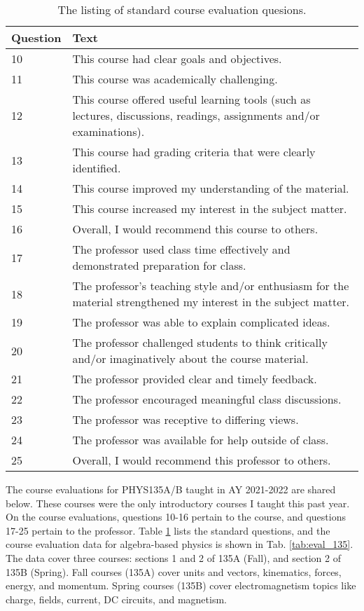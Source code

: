 \documentclass[../../main.tex]{subfiles}
\begin{document}
\begin{table}[ht]
\scriptsize
\centering
\begin{tabular}{| p{1.5cm} | p{14cm} |}
\hline
\hline
Question & Text \\ \hline
10 & This course had clear goals and objectives. \\ \hline
11 & This course was academically challenging. \\ \hline
12 & This course offered useful learning tools (such as lectures, discussions, readings, assignments and/or examinations). \\ \hline
13 & This course had grading criteria that were clearly identified. \\ \hline
14 & This course improved my understanding of the material. \\ \hline
15 & This course increased my interest in the subject matter. \\ \hline
16 & Overall, I would recommend this course to others. \\ \hline
17 & The professor used class time effectively and demonstrated preparation for class. \\ \hline
18 & The professor's teaching style and/or enthusiasm for the material strengthened my interest in the subject matter. \\ \hline
19 & The professor was able to explain complicated ideas. \\ \hline
20 & The professor challenged students to think critically and/or imaginatively about the course material. \\ \hline
21 & The professor provided clear and timely feedback. \\ \hline
22 & The professor encouraged meaningful class discussions. \\ \hline
23 & The professor was receptive to differing views. \\ \hline
24 & The professor was available for help outside of class. \\ \hline
25 & Overall, I would recommend this professor to others. \\ \hline
\hline
\end{tabular}
\caption{\label{tab:questions} The listing of standard course evaluation quesions.}
\end{table}

The course evaluations for PHYS135A/B taught in AY 2021-2022 are shared below.  These courses were the only introductory courses I taught this past year.  On the course evaluations, questions 10-16 pertain to the course, and questions 17-25 pertain to the professor.  Table \ref{tab:questions} lists the standard questions, and the course evaluation data for algebra-based physics is shown in Tab. \ref{tab:eval_135}.  The data cover three courses: sections 1 and 2 of 135A (Fall), and section 2 of 135B (Spring).  Fall courses (135A) cover units and vectors, kinematics, forces, energy, and momentum.  Spring courses (135B) cover electromagnetism topics like charge, fields, current, DC circuits, and magnetism.
\\
\vspace{0.15cm}
\end{document}

